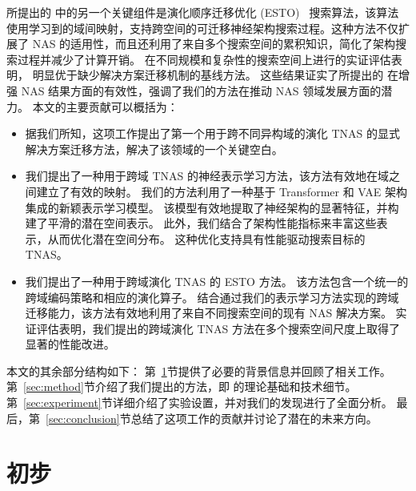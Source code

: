 \documentclass[../main_zh.tex]{subfiles}
\begin{document}
所提出的 \OUR{} 中的另一个关键组件是演化顺序迁移优化 (ESTO)~\cite{DBLP:journals/cim/TanFJ21,DBLP:journals/tec/XueYHZCST22,10342789} 搜索算法，该算法使用学习到的域间映射，支持跨空间的可迁移神经架构搜索过程。这种方法不仅扩展了 NAS 的适用性，而且还利用了来自多个搜索空间的累积知识，简化了架构搜索过程并减少了计算开销。
在不同规模和复杂性的搜索空间上进行的实证评估表明，\OUR{} 明显优于缺少解决方案迁移机制的基线方法。
这些结果证实了所提出的 \OUR{} 在增强 NAS 结果方面的有效性，强调了我们的方法在推动 NAS 领域发展方面的潜力。
本文的主要贡献可以概括为：
\begin{itemize}
  \item 据我们所知，这项工作提出了第一个用于跨不同异构域的演化 TNAS 的显式解决方案迁移方法，解决了该领域的一个关键空白。

  \item 我们提出了一种用于跨域 TNAS 的神经表示学习方法，该方法有效地在域之间建立了有效的映射。
        我们的方法利用了一种基于 Transformer 和 VAE 架构集成的新颖表示学习模型。
        该模型有效地提取了神经架构的显著特征，并构建了平滑的潜在空间表示。
        此外，我们结合了架构性能指标来丰富这些表示，从而优化潜在空间分布。
        这种优化支持具有性能驱动搜索目标的 TNAS。

  \item 我们提出了一种用于跨域演化 TNAS 的 ESTO 方法。
        该方法包含一个统一的跨域编码策略和相应的演化算子。
        结合通过我们的表示学习方法实现的跨域迁移能力，该方法有效地利用了来自不同搜索空间的现有 NAS 解决方案。
        实证评估表明，我们提出的跨域演化 TNAS 方法在多个搜索空间尺度上取得了显著的性能改进。
\end{itemize}


本文的其余部分结构如下：
第~\ref{sec:preliminary}节提供了必要的背景信息并回顾了相关工作。
第~\ref{sec:method}节介绍了我们提出的方法，即 \OUR{} 的理论基础和技术细节。
第~\ref{sec:experiment}节详细介绍了实验设置，并对我们的发现进行了全面分析。
最后，第~\ref{sec:conclusion}节总结了这项工作的贡献并讨论了潜在的未来方向。

\section{初步}\label{sec:preliminary}
\end{document}

